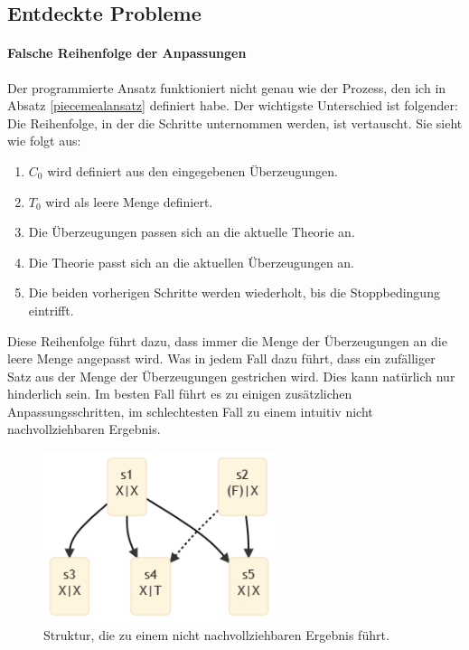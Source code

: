\documentclass{article}
\begin{document}
\subsection{Entdeckte Probleme} \label{found problems}
\paragraph{Falsche Reihenfolge der Anpassungen} Der programmierte Ansatz funktioniert nicht genau wie der Prozess, den ich in Absatz \ref{piecemealansatz} definiert habe. Der wichtigste Unterschied ist folgender: Die Reihenfolge, in der die Schritte unternommen werden, ist vertauscht. Sie sieht wie folgt aus:
\begin{enumerate}
    \item $C_0$ wird definiert aus den eingegebenen Überzeugungen.
    \item $T_0$ wird als leere Menge definiert.
    \item Die Überzeugungen passen sich an die aktuelle Theorie an.
    \item Die Theorie passt sich an die aktuellen Überzeugungen an.
    \item Die beiden vorherigen Schritte werden wiederholt, bis die Stoppbedingung eintrifft.
\end{enumerate}

Diese Reihenfolge führt dazu, dass immer die Menge der Überzeugungen an die leere Menge angepasst wird. Was in jedem Fall dazu führt, dass ein zufälliger Satz aus der Menge der Überzeugungen gestrichen wird. Dies kann natürlich nur hinderlich sein. Im besten Fall führt es zu einigen zusätzlichen Anpassungsschritten, im schlechtesten Fall zu einem intuitiv nicht nachvollziehbaren Ergebnis.

\begin{figure}[ht]
  \centering
  \includegraphics[width=\textwidth,height=5cm,keepaspectratio]{images/wierd.png}
  \caption{Struktur, die zu einem nicht nachvollziehbaren Ergebnis führt.\label{fig:wierd}}
\end{figure}
\end{document}
